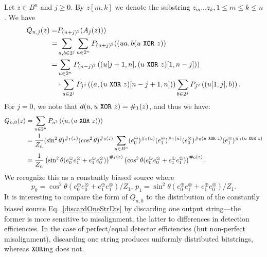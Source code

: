 \documentclass[%
 preprint,
 showpacs,
 showkeys,
 preprintnumbers,
  amsmath,amssymb,
  aps,
 pra,
  longbibliography,
  floatfix,
 ]{revtex4-1}
\newtheorem{Theorem}{Theorem}
\theoremstyle{definition}
\newcommand{\xor}{\text{ ${\tt XOR}$ }}
\begin{document}
	Let $z \in B^n$ and $j \ge 0$. By $z[m,k]$ we denote the substring $z_m\dots z_k, 1\le m \le k\le n$. We have
	\begin{align*}
		Q_{n,j}(z) =& P_{(n+j)^2}(A_j(z)))\\
		=& \sum_{a,b\in 2^j}\sum_{u\in 2^n}P_{(n+j)^2}((ua,b(u\xor z))\\
		=& \sum_{u\in 2^n}P_{(n-j)^2}\left((u[j+1,n],(u\xor z)[1,n-j])\right)  \\
		&\cdot \sum_{a\in 2^j}P_{j^2}\left((a,(u\xor z)[n-j+1,n])\right)  \sum_{b\in 2^j}P_{j^2}\left((u[1,j],b)\right).
	\end{align*}
	For $j=0$, we note that $d(u, u\xor z) = \#_1(z)$, and thus we have:
\begin{align*}
	Q_{n,0}(z) &= \sum_{u\in 2^n}P_{n^2}\left((u,(u\xor z))\right) \\
		&= \frac{1}{Z_n}(\sin^2\theta)^{\#_1(z)}(\cos^2\theta)^{\#_0(z)} \sum_{u\in B^n} (e_0^\oplus)^{\#_0(u)}(e_1^\oplus)^{\#_1(u)}(e_0^\otimes)^{\#_0(u\xor z)}(e_1^\otimes)^{\#_1(u\xor z)}\\
		&= \frac{1}{Z_n}\left(\sin^2\theta (e_0^\oplus e_1^\otimes + e_1^\oplus e_0^\otimes) \right)^{\#_1(z)}\left(\cos^2\theta (e_0^\oplus e_0^\otimes + e_1^\oplus e_1^\otimes) \right)^{\#_0(z)}.
\end{align*}
We recognize this as a constantly biased source where $$p_0 = \cos^2\theta (e_0^\oplus e_0^\otimes + e_1^\oplus e_1^\otimes)/Z_1,\, p_1 = \sin^2\theta (e_0^\oplus e_1^\otimes + e_1^\oplus e_0^\otimes)/Z_1.$$ It is interesting to compare the form of $Q_{n,0}$ to the distribution of the constantly biased source Eq.~\eqref{discardOneStrDis} by discarding one output string---the former is more sensitive to misalignment, the latter to differences in detection efficiencies. In the case of perfect/equal detector efficiencies (but non-perfect misalignment), discarding one string produces uniformly distributed bitstrings, whereas ${\tt XOR}$ing does not.
\end{document}
